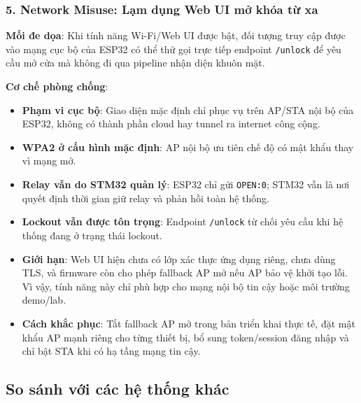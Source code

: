\subsubsection{5. Network Misuse: Lạm dụng Web UI mở khóa từ xa}

\textbf{Mối đe dọa}: Khi tính năng Wi-Fi/Web UI được bật, đối tượng truy cập được vào mạng cục bộ của ESP32 có thể thử gọi trực tiếp endpoint \texttt{/unlock} để yêu cầu mở cửa mà không đi qua pipeline nhận diện khuôn mặt.

\textbf{Cơ chế phòng chống}:
\begin{itemize}
  \item \textbf{Phạm vi cục bộ}: Giao diện mặc định chỉ phục vụ trên AP/STA nội bộ của ESP32, không có thành phần cloud hay tunnel ra internet công cộng.
  \item \textbf{WPA2 ở cấu hình mặc định}: AP nội bộ ưu tiên chế độ có mật khẩu thay vì mạng mở.
  \item \textbf{Relay vẫn do STM32 quản lý}: ESP32 chỉ gửi \texttt{OPEN:0}; STM32 vẫn là nơi quyết định thời gian giữ relay và phản hồi toàn hệ thống.
  \item \textbf{Lockout vẫn được tôn trọng}: Endpoint \texttt{/unlock} từ chối yêu cầu khi hệ thống đang ở trạng thái lockout.
  \item \textbf{Giới hạn}: Web UI hiện chưa có lớp xác thực ứng dụng riêng, chưa dùng TLS, và firmware còn cho phép fallback AP mở nếu AP bảo vệ khởi tạo lỗi. Vì vậy, tính năng này chỉ phù hợp cho mạng nội bộ tin cậy hoặc môi trường demo/lab.
  \item \textbf{Cách khắc phục}: Tắt fallback AP mở trong bản triển khai thực tế, đặt mật khẩu AP mạnh riêng cho từng thiết bị, bổ sung token/session đăng nhập và chỉ bật STA khi có hạ tầng mạng tin cậy.
\end{itemize}

\subsection{So sánh với các hệ thống khác}

